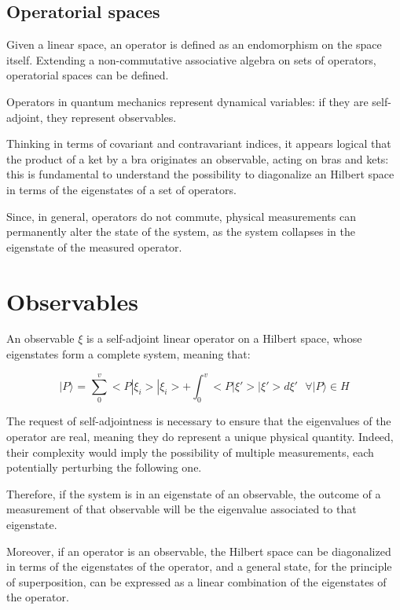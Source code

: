 \documentclass{article}
\begin{document}
\subsection{Operatorial spaces}

Given a linear space, an operator is defined as an endomorphism on the space itself.
Extending a non-commutative associative algebra on sets of operators, operatorial spaces can be defined.

Operators in quantum mechanics represent dynamical variables: if they are self-adjoint, they represent observables.

Thinking in terms of covariant and contravariant indices, it appears logical that the product of a ket by a bra originates an observable, acting on bras and kets:
this is fundamental to understand the possibility to diagonalize an Hilbert space in terms of the eigenstates of a set of operators.

Since, in general, operators do not commute, physical measurements can permanently alter the state of the system, as the system collapses in the eigenstate of the measured operator.

\section{Observables}

\begin{tcolorbox}[colframe=gray!50, colback=gray!10, coltitle=black, title=Definition]
    An observable $\xi$ is a self-adjoint linear operator on a Hilbert space, whose eigenstates form a complete system, meaning that:

    \begin{equation}
        \text{$|P\rangle$ = $\sum_{0}^{v} <P|\xi_i>|\xi_i> + \int_{0}^{v} <P|\xi'>|\xi'>d\xi'$  $\forall |P\rangle \in H$}
    \end{equation}
\end{tcolorbox}

The request of self-adjointness is necessary to ensure that the eigenvalues of the operator are real, meaning they do represent a unique physical quantity.
Indeed, their complexity would imply the possibility of multiple measurements, each potentially perturbing the following one.

Therefore, if the system is in an eigenstate of an observable, the outcome of a measurement of that observable will be the eigenvalue associated to that eigenstate.

Moreover, if an operator is an observable, the Hilbert space can be diagonalized in terms of the eigenstates of the operator, and a general state,
for the principle of superposition, can be expressed as a linear combination of the eigenstates of the operator.
\end{document}
